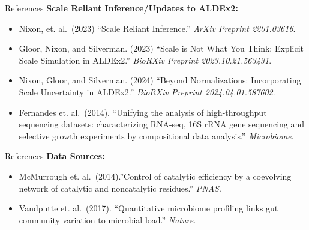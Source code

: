 \documentclass[
  ignorenonframetext,
]{beamer}
\begin{document}
\begin{frame}{References}
\protect\hypertarget{references}{}
\textbf{Scale Reliant Inference/Updates to ALDEx2:}

\begin{itemize}
\item
  Nixon, et. al.~(2023) ``Scale Reliant Inference.'' \emph{ArXiv
  Preprint 2201.03616}.
\item
  Gloor, Nixon, and Silverman. (2023) ``Scale is Not What You Think;
  Explicit Scale Simulation in ALDEx2.'' \emph{BioRXiv Preprint
  2023.10.21.563431}.
\item
  Nixon, Gloor, and Silverman. (2024) ``Beyond Normalizations:
  Incorporating Scale Uncertainty in ALDEx2.'' \emph{BioRXiv Preprint
  2024.04.01.587602}.
\item
  Fernandes et. al.~(2014). ``Unifying the analysis of high-throughput
  sequencing datasets: characterizing RNA-seq, 16S rRNA gene sequencing
  and selective growth experiments by compositional data analysis.''
  \emph{Microbiome}.
\end{itemize}
\end{frame}

\begin{frame}{References}
\protect\hypertarget{references-1}{}
\textbf{Data Sources:}

\begin{itemize}
\item
  McMurrough et. al.~(2014).''Control of catalytic efficiency by a
  coevolving network of catalytic and noncatalytic residues.''
  \emph{PNAS}.
\item
  Vandputte et. al.~(2017). ``Quantitative microbiome profiling links
  gut community variation to microbial load.'' \emph{Nature}.
\end{itemize}
\end{frame}
\end{document}
